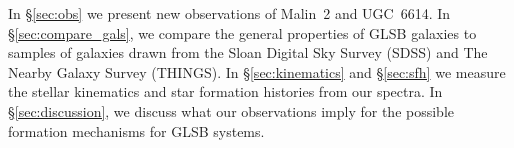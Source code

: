 \documentclass{emulateapj}
\newcommand\msun{\rm{M}_\odot}
\newcommand\HI{\ion{H}{1}}
\begin{document}
In \S\ref{sec:obs} we present new observations of Malin~2 and UGC~6614. In \S\ref{sec:compare_gals}, we compare the general properties of GLSB galaxies to samples of galaxies drawn from the Sloan Digital Sky Survey (SDSS) and  The \HI Nearby Galaxy Survey (THINGS).  In \S\ref{sec:kinematics} and \S\ref{sec:sfh} we measure the stellar kinematics and star formation histories from our spectra. In \S\ref{sec:discussion}, we discuss what our observations imply for the possible formation mechanisms for GLSB systems.












\end{document}
